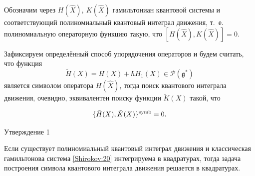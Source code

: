  

Обозначим через $H(\hat{X}),\ K(\hat{X}) $ гамильтониан квантовой системы и соответствующий полиномиальный квантовый интеграл движения, т.~е. полиномиальную операторную функцию такую, что $ [H(\hat{X}),K(\hat{X})]=0 $. 

Зафиксируем определённый способ упорядочения операторов и будем считать, что функция $$ \tilde{H}(X)=H(X)+\hbar H_1(X)\in \mathcal{P}(\mathfrak{g}^\ast)$$ является символом оператора $ H(\hat{X})$, тогда поиск квантового интеграла движения, очевидно, эквивалентен поиску функции $ \tilde K(X) $ такой, что

\begin{equation}

\label{Shirokov:22}

 \{\tilde{H}(X),\tilde{K}(X)\}^{\rm symb}=0.

\end{equation} 



\begin{newthm}{Утверждение 1}\label{prop:02}

Если существует полиномиальный квантовый интеграл движения и классическая гамильтонова система \eqref{Shirokov:20} интегрируема в квадратурах{\rm ,} тогда задача построения символа квантового интеграла движения решается в квадратурах{\rm .}

\end{newthm}



\smallskip



